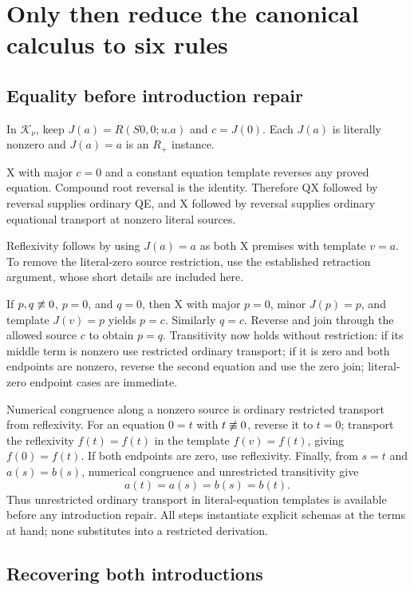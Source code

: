 \documentclass[11pt]{article}
\theoremstyle{definition}
\newcommand{\lit}{\mathrel{\equiv}}
\newcommand{\Knorm}{\mathcal K_\nu}
\begin{document}
\section{Only then reduce the canonical calculus to six rules}

\subsection{Equality before introduction repair}

In \(\Knorm\), keep \(J(a)=R(S0,0;u.a)\) and \(c=J(0)\). Each \(J(a)\) is literally nonzero and \(J(a)=a\) is an \(R_+\) instance.

X with major \(c=0\) and a constant equation template reverses any proved equation. Compound root reversal is the identity. Therefore QX followed by reversal supplies ordinary QE, and X followed by reversal supplies ordinary equational transport at nonzero literal sources.

Reflexivity follows by using \(J(a)=a\) as both X premises with template \(v=a\). To remove the literal-zero source restriction, use the established retraction argument, whose short details are included here.

If \(p,q\not\lit0\), \(p=0\), and \(q=0\), then X with major \(p=0\), minor \(J(p)=p\), and template \(J(v)=p\) yields \(p=c\). Similarly \(q=c\). Reverse and join through the allowed source \(c\) to obtain \(p=q\). Transitivity now holds without restriction: if its middle term is nonzero use restricted ordinary transport; if it is zero and both endpoints are nonzero, reverse the second equation and use the zero join; literal-zero endpoint cases are immediate.

Numerical congruence along a nonzero source is ordinary restricted transport from reflexivity. For an equation \(0=t\) with \(t\not\lit0\), reverse it to \(t=0\); transport the reflexivity \(f(t)=f(t)\) in the template \(f(v)=f(t)\), giving \(f(0)=f(t)\). If both endpoints are zero, use reflexivity. Finally, from \(s=t\) and \(a(s)=b(s)\), numerical congruence and unrestricted transitivity give
\[
a(t)=a(s)=b(s)=b(t).
\]
Thus unrestricted ordinary transport in literal-equation templates is available before any introduction repair. All steps instantiate explicit schemas at the terms at hand; none substitutes into a restricted derivation.

\subsection{Recovering both introductions}
\end{document}

